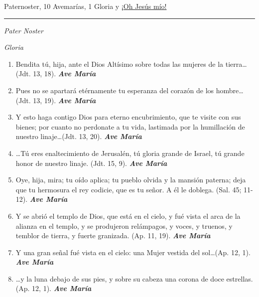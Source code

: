 \documentclass[a4paper,11pt, oneside]{report}
\begin{document}
{{       Paternoster, 10 Avemarías, 1 Gloria y \hyperlink{finalAsuncion}{¡Oh Jesús mío!}

      \begin{center}\rule{1\linewidth}{\linethickness}\end{center}

      \medskip
      \textit{Pater Noster}

      \indent\textit{Gloria} \par

      \begin{enumerate}

        \item Bendita tú, hija, ante el Dios Altísimo sobre todas las mujeres de la tierra\ldots (Jdt. 13, 18). \textbf{\textit{Ave María}}

        \item Pues no se apartará etérnamente tu esperanza del corazón de los hombre\ldots (Jdt. 13, 19). \textbf{\textit{Ave María}}

        \item Y esto haga contigo Dios para eterno encubrimiento, que te visite con sus bienes; por cuanto no perdonate
        a tu vida, lastimada por la humillación de nuestro linaje\ldots (Jdt. 13, 20). \textbf{\textit{Ave María}}

        \item {\ldots}Tú eres enaltecimiento de Jerusalén, tú gloria grande de Israel, tú grande honor de nuestro linaje. (Jdt. 15, 9). \textbf{\textit{Ave María}}

        \item Oye, hija, mira; tu oído aplica; tu pueblo olvida y la mansión paterna; deja que tu hermosura
        el rey codicie, que es tu señor. A él le doblega. (Sal. 45; 11-12). \textbf{\textit{Ave María}}

        \item Y se abrió el templo de Dios, que está en el cielo, y fué vista el arca de la alianza en el templo,
        y se produjeron relámpagos, y voces, y truenos, y temblor de tierra, y fuerte granizada. (Ap. 11, 19). \textbf{\textit{Ave María}}

        \item Y una gran señal fué vista en el cielo: una Mujer vestida del sol\ldots (Ap. 12, 1). \textbf{\textit{Ave María}}

        \item {\ldots}y la luna debajo de sus pies, y sobre su cabeza una corona de doce estrellas. (Ap. 12, 1). \textbf{\textit{Ave María}}


\end{enumerate}}}
\end{document}
